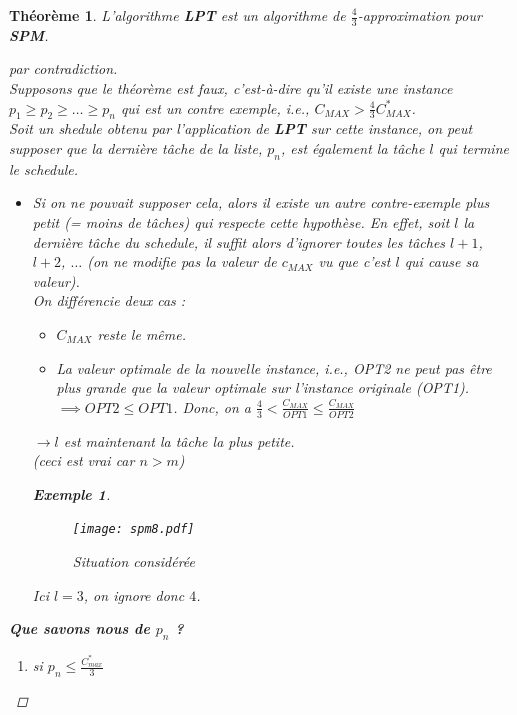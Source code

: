 \documentclass[12pt]{article}
\newcommand{\titre}[1]{\textcolor{title}{#1}}
\newtheorem{exemple}{Exemple}[section]
\newtheorem{thm}{Th\'eor\`eme}[section]
\newtheorem{proof}{Preuve}[section]
\begin{document}
\begin{thm} L'algorithme \textbf{LPT} est un algorithme de $\frac 4 3$-approximation pour \textbf{\titre{SPM}}.
\begin{proof}[par contradiction]$ $\\
Supposons que le théorème est faux, c'est-à-dire qu'il existe une instance $p_1\geq p_2\geq \ldots \geq p_n$ qui est un contre exemple, i.e., $C_{MAX} > \frac{4}{3} C^*_{MAX}$. \\
Soit un shedule obtenu par l'application de \textbf{LPT} sur cette instance, on peut supposer que la dernière tâche de la liste, $p_n$, est
également la tâche $l$ qui termine le schedule.
\begin{itemize}
\item[$\hookrightarrow$] Si on ne pouvait supposer cela, alors il existe un autre contre-exemple plus petit (= moins de tâches) qui
respecte cette hypothèse. En effet, soit $l$ la dernière tâche du schedule, il suffit alors d'ignorer toutes les tâches $l+1$, $l+2$,
$\ldots$ (on ne modifie pas la valeur de $c_{MAX}$ vu que c'est $l$ qui cause sa valeur).\\
On différencie deux cas :
\begin{itemize}
	\item $C_{MAX}$ reste le même.
	\item La valeur optimale de la nouvelle instance, i.e., OPT2 ne peut pas être
	plus grande que la valeur optimale sur l'instance originale (OPT1). \\
	$\implies OPT2 \leq OPT1$. Donc, on a $\frac{4}{3} < \frac{C_{MAX}}{OPT1} \leq
	\frac{C_{MAX}}{OPT2}$
\end{itemize}
	 $\rightarrow l$ est maintenant la tâche la plus petite. \\
	 \textit{(ceci est vrai car $n>m$)}
	 \begin{exemple}$ $
\begin{figure}[H]
    \begin{center}
    \texttt{[image: spm8.pdf]}
    \caption{Situation considérée}
    \end{center}
\end{figure}
	Ici $l=3$, on ignore donc $4$.
	 \end{exemple}
\end{itemize}
\textbf{Que savons nous de $p_n$ ?}
\begin{enumerate}
\item[a)] si $p_n \leq \frac{C^*_{max}}{3}$


\end{enumerate}
\end{proof}
\end{thm}
\end{document}
